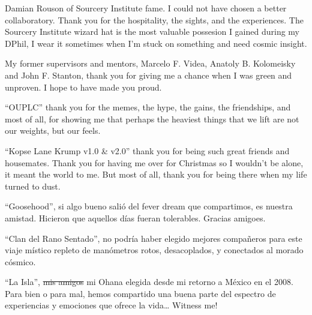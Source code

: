 \begin{frontmatter}[Acknowledgements]
\begin{justify}
        Damian Rouson of Sourcery Institute fame. I could not have chosen a better collaboratory. Thank you for the hospitality, the sights, and the experiences. The Sourcery Institute wizard hat is the most valuable possesion I gained during my DPhil, I wear it sometimes when I'm stuck on something and need cosmic insight.

        My former supervisors and mentors, Marcelo F. Videa, Anatoly B. Kolomeisky and John F. Stanton, thank you for giving me a chance when I was green and unproven. I hope to have made you proud.

        ``OUPLC'' thank you for the memes, the hype, the gains, the friendships, and most of all, for showing me that perhaps the heaviest things that we lift are not our weights, but our feels.

        ``Kopse Lane Krump v1.0 \& v2.0'' thank you for being such great friends and housemates. Thank you for having me over for Christmas so I wouldn't be alone, it meant the world to me. But most of all, thank you for being there when my life turned to dust.

        ``Goosehood'', si algo bueno salió del fever dream que compartimos, es nuestra amistad. Hicieron que aquellos días fueran tolerables. Gracias amigoes.

        ``Clan del Rano Sentado'', no podría haber elegido mejores compañeros para este viaje místico repleto de manómetros rotos, desacoplados, y conectados al morado cósmico.

        ``La Isla'', \sout{mis amigos} mi Ohana elegida desde mi retorno a México en el 2008. Para bien o para mal, hemos compartido una buena parte del espectro de experiencias y emociones que ofrece la vida\ldots{} Witness me!
    \end{justify}

\end{frontmatter}

